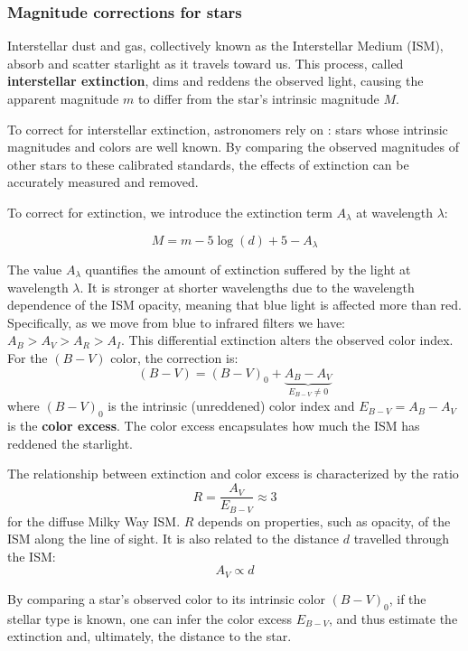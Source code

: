 \subsubsection{Magnitude corrections for stars}

Interstellar dust and gas, collectively known as the 
Interstellar Medium (ISM), absorb and scatter starlight as 
it travels toward us. This process, called \textbf{interstellar extinction}, dims and reddens the observed 
light, causing the apparent magnitude $m$ to differ from 
the star's intrinsic magnitude $M$.

To correct for interstellar extinction, astronomers rely on : stars whose intrinsic magnitudes and colors are well known. By comparing the observed magnitudes of other stars to these calibrated standards, the effects of extinction can be accurately measured and removed.

To correct for extinction, we introduce the extinction term $A_\lambda$ at wavelength $\lambda$:

$$
M = m - 5 \log (d) + 5 - A_{\lambda}
$$

The value $A_{\lambda}$ quantifies the amount of extinction suffered by the light at wavelength $\lambda$. It is stronger at shorter wavelengths due to the wavelength dependence of the ISM opacity, meaning that blue light is affected more than red. Specifically, as we move from blue to infrared filters we have: $A_B > A_V > A_R > A_I$. This differential extinction alters the observed color index. For the $(B-V)$ color, the correction is:
$$
(B - V) = (B - V)_0 + \underbrace{A_B - A_V}_{E_{B-V} \neq 0}
$$
where $(B-V)_0$ is the intrinsic (unreddened) color index and $E_{B-V} = A_B - A_V$ is the \textbf{color excess}. The color excess encapsulates how much the ISM has reddened the starlight.



The relationship between extinction and color excess is characterized by the ratio
$$
R = \dfrac{A_V}{E_{B-V}} \approx 3
$$
for the diffuse Milky Way ISM. $R$ depends on properties, such as opacity, of the ISM along the line of sight. It is also related to the distance $d$ travelled through the ISM:
$$
A_V \propto d
$$

\begin{observationblock}
    By comparing a star's observed color to its intrinsic color $(B - V)_0$, if the stellar type is known, one can infer the color excess $E_{B-V}$, and thus estimate the extinction and, ultimately, the distance to the star.
\end{observationblock}

